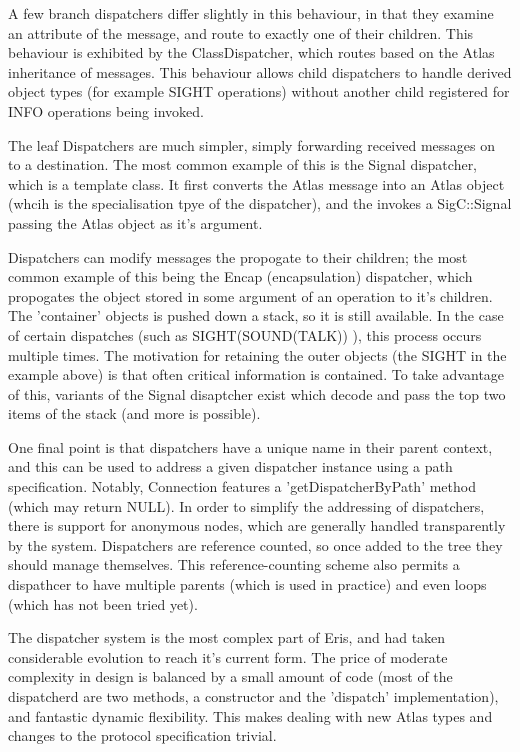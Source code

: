 \documentclass{article}
\begin{document}
{A few branch dispatchers differ slightly in this behaviour, in that they examine an attribute of the message, and route to exactly one of their children. This behaviour is exhibited by the ClassDispatcher, which routes based on the Atlas inheritance of messages. This behaviour allows child dispatchers to handle derived object types (for example SIGHT operations) without another child registered for INFO operations being invoked.

The leaf Dispatchers are much simpler, simply forwarding received messages on to a destination. The most common example of this is the Signal dispatcher, which is a template class. It first converts the Atlas message into an Atlas object (whcih is the specialisation tpye of the dispatcher), and the invokes a SigC::Signal passing the Atlas object as it's argument.

Dispatchers can modify messages the propogate to their children; the most common example of this being the Encap (encapsulation) dispatcher, which propogates the object stored in some argument of an operation to it's children. The 'container' objects is pushed down a stack, so it is still available. In the case of certain dispatches (such as SIGHT(SOUND(TALK)) ), this process occurs multiple times. The motivation for retaining the outer objects (the SIGHT in the example above) is that often critical information is contained. To take advantage of this, variants of the Signal disaptcher exist which decode and pass the top two items of the stack (and more is possible).

One final point is that dispatchers have a unique name in their parent context, and this can be used to address a given dispatcher instance using a path specification. Notably, Connection features a 'getDispatcherByPath' method (which may return NULL). In order to simplify the addressing of dispatchers, there is support for anonymous nodes, which are generally handled transparently by the system. Dispatchers are reference counted, so once added to the tree they should manage themselves. This reference-counting scheme also permits a dispathcer to have multiple parents (which is used in practice) and even loops (which has not been tried yet).

The dispatcher system is the most complex part of Eris, and had taken considerable evolution to reach it's current form. The price of moderate complexity in design is balanced by a small amount of code (most of the dispatcherd are two methods, a constructor and the 'dispatch' implementation), and fantastic dynamic flexibility. This makes dealing with new Atlas types and  changes to the protocol specification trivial.

}
\end{document}
